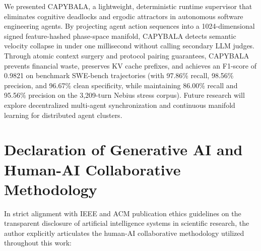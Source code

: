 \documentclass[journal]{IEEEtran}
\begin{document}
We presented CAPYBALA, a lightweight, deterministic runtime supervisor that eliminates cognitive deadlocks and ergodic attractors in autonomous software engineering agents. By projecting agent action sequences into a 1024-dimensional signed feature-hashed phase-space manifold, CAPYBALA detects semantic velocity collapse in under one millisecond without calling secondary LLM judges. Through atomic context surgery and protocol pairing guarantees, CAPYBALA prevents financial waste, preserves KV cache prefixes, and achieves an F1-score of 0.9821 on benchmark SWE-bench trajectories (with 97.86\% recall, 98.56\% precision, and 96.67\% clean specificity, while maintaining 86.00\% recall and 95.56\% precision on the 3,209-turn Nebius stress corpus). Future research will explore decentralized multi-agent synchronization and continuous manifold learning for distributed agent clusters.

\section*{Declaration of Generative AI and Human-AI Collaborative Methodology}
In strict alignment with IEEE and ACM publication ethics guidelines on the transparent disclosure of artificial intelligence systems in scientific research, the author explicitly articulates the human-AI collaborative methodology utilized throughout this work:
\end{document}

